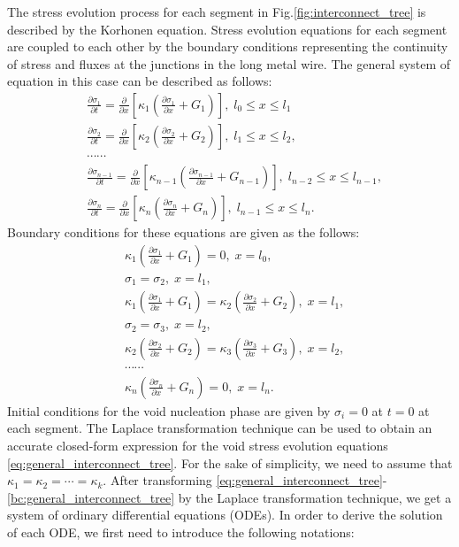 The stress evolution process for each segment in Fig.\ref{fig:interconnect_tree} is described by the Korhonen equation. Stress evolution equations for each segment are coupled to each other by the boundary conditions representing the continuity of stress and fluxes at the junctions in the long metal wire. The general system of equation in this case can be described as follows:
\begin{equation} \label{eq:general_interconnect_tree}
\begin{split}
&\frac{\partial \sigma_1}{\partial t}=\frac{\partial }{\partial
x}[\kappa_1(\frac{\partial \sigma_1}{\partial x}+G_1)],\;l_0\leq x \leq l_1 \\
&\frac{\partial \sigma_2}{\partial t}=\frac{\partial }{\partial
x}[\kappa_2(\frac{\partial \sigma_2}{\partial
x}+G_2)],\;l_1\leq x \leq l_2, \\
&\cdots\cdots\\
&\frac{\partial \sigma_{n-1}}{\partial t}=\frac{\partial }{\partial
x}[\kappa_{n-1}(\frac{\partial \sigma_{n-1}}{\partial
x}+G_{n-1})],\;l_{n-2}\leq x \leq l_{n-1}, \\
&\frac{\partial \sigma_{n}}{\partial t}=\frac{\partial }{\partial
x}[\kappa_{n}(\frac{\partial \sigma_{n}}{\partial
x}+G_{n})],\;l_{n-1}\leq x \leq l_n.
 \end{split}
 \end{equation}
Boundary conditions for these equations are given as the follows:
 \begin{equation} \label{bc:general_interconnect_tree}
\begin{split}
&\kappa_1(\frac{\partial \sigma_1}{\partial x}+G_1)=0,\;x=l_0,\\
&\sigma_1=\sigma_2,\;x=l_1,\\
&\kappa_1(\frac{\partial \sigma_1}{\partial
x}+G_1)=\kappa_2(\frac{\partial \sigma_2}{\partial
x}+G_2),\;x=l_1,\\
&\sigma_2=\sigma_3,\;x=l_2,\\
&\kappa_2(\frac{\partial \sigma_2}{\partial
x}+G_2)=\kappa_3(\frac{\partial \sigma_3}{\partial
x}+G_3),\;x=l_2,\\
&\cdots\cdots \\
&\kappa_n(\frac{\partial \sigma_n}{\partial
x}+G_n)=0,\;x=l_n.
 \end{split}
 \end{equation}
Initial conditions for the void nucleation phase are given by $\sigma_i=0$ at $t=0$ at each segment. The Laplace transformation technique can be used to obtain an accurate closed-form expression for the void stress evolution equations \eqref{eq:general_interconnect_tree}. For the sake of simplicity, we need to assume that $\kappa_1=\kappa_2=\cdots=\kappa_k$. After transforming \eqref{eq:general_interconnect_tree}-\eqref{bc:general_interconnect_tree} by the Laplace transformation technique, we get a system of ordinary differential equations (ODEs). In order to derive the solution of each ODE, we first need to introduce the following notations:
